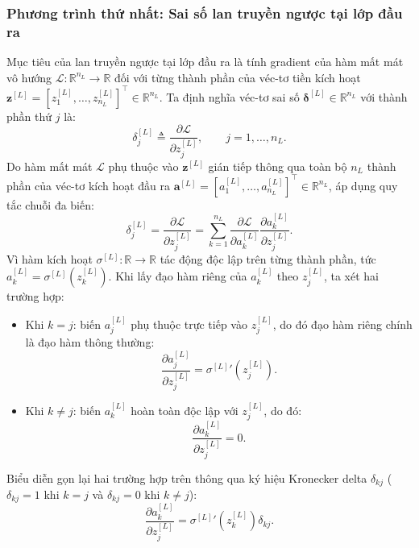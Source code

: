 \subsubsection{Phương trình thứ nhất: Sai số lan truyền ngược tại lớp đầu ra}
Mục tiêu của lan truyền ngược tại lớp đầu ra là tính gradient của hàm mất mát vô hướng $\mathcal{L}: \mathbb{R}^{n_L} \to \mathbb{R}$ đối với từng thành phần của véc-tơ tiền kích hoạt $\mathbf{z}^{[L]} = [z_1^{[L]}, \dots, z_{n_L}^{[L]}]^\top \in \mathbb{R}^{n_L}$. Ta định nghĩa véc-tơ sai số $\boldsymbol{\delta}^{[L]} \in \mathbb{R}^{n_L}$ với thành phần thứ $j$ là:
\begin{equation}
\delta_j^{[L]} \triangleq \frac{\partial \mathcal{L}}{\partial z_j^{[L]}}, \qquad j = 1, \dots, n_L.
\label{eq:delta_def}
\end{equation}
Do hàm mất mát $\mathcal{L}$ phụ thuộc vào $\mathbf{z}^{[L]}$ gián tiếp thông qua toàn bộ $n_L$ thành phần của véc-tơ kích hoạt đầu ra $\mathbf{a}^{[L]} = [a_1^{[L]}, \dots, a_{n_L}^{[L]}]^\top \in \mathbb{R}^{n_L}$, áp dụng quy tắc chuỗi đa biến:
\begin{equation}
\delta_j^{[L]} = \frac{\partial\mathcal{L}}{\partial z_j^{[L]}} = \sum_{k=1}^{n_L} \frac{\partial\mathcal{L}}{\partial a_k^{[L]}} \frac{\partial a_k^{[L]}}{\partial z_j^{[L]}}.
\label{eq:delta_chain}
\end{equation}
Vì hàm kích hoạt $\sigma^{[L]}: \mathbb{R} \to \mathbb{R}$ tác động độc lập trên từng thành phần, tức $a_k^{[L]} = \sigma^{[L]}\!\left(z_k^{[L]}\right)$. Khi lấy đạo hàm riêng của $a_k^{[L]}$ theo $z_j^{[L]}$, ta xét hai trường hợp:
\begin{itemize}
    \item Khi $k = j$: biến $a_j^{[L]}$ phụ thuộc trực tiếp vào $z_j^{[L]}$, do đó đạo hàm riêng chính là đạo hàm thông thường:
    \begin{equation}
    \frac{\partial a_j^{[L]}}{\partial z_j^{[L]}} = {\sigma^{[L]}}'\!\left(z_j^{[L]}\right).
    \end{equation}
    \item Khi $k \neq j$: biến $a_k^{[L]}$ hoàn toàn độc lập với $z_j^{[L]}$, do đó:
    \begin{equation}
    \frac{\partial a_k^{[L]}}{\partial z_j^{[L]}} = 0.
    \end{equation}
\end{itemize}
Biểu diễn gọn lại hai trường hợp trên thông qua ký hiệu Kronecker delta $\delta_{kj}$ ($\delta_{kj} = 1$ khi $k = j$ và $\delta_{kj} = 0$ khi $k \neq j$):
\begin{equation}
\frac{\partial a_k^{[L]}}{\partial z_j^{[L]}} = {\sigma^{[L]}}'\!\left(z_k^{[L]}\right) \delta_{kj}.
\label{eq:derivative_elementwise}
\end{equation}
